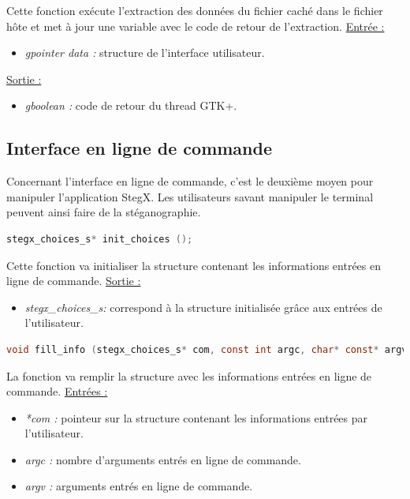 \documentclass[11pt]{article}
\begin{document}
Cette fonction exécute l'extraction des données du fichier caché dans le 
fichier hôte et met à jour une variable avec le code de retour de l'extraction.
\newline
\underline{Entrée :} 
\begin{itemize}
\item \textit{gpointer data :} structure de l'interface utilisateur. 
\end{itemize}
\underline{Sortie :}
\begin{itemize}
\item \textit{gboolean :} code de retour du thread GTK+.
\newline 
\end{itemize}

\subsection{Interface en ligne de commande}

Concernant l'interface en ligne de commande, c'est le deuxième moyen pour 
manipuler l'application StegX. Les utilisateurs savant manipuler le terminal 
peuvent ainsi faire de la stéganographie. 

\begin{lstlisting}[language=c]
stegx_choices_s* init_choices ();
\end{lstlisting}

Cette fonction va initialiser la structure contenant les informations 
entrées en ligne de commande. 
\newline
\underline{Sortie :} 
\begin{itemize}
\item \textit{stegx\_choices\_s:} correspond à la structure initialisée 
grâce aux entrées de l'utilisateur. 
\newline 
\end{itemize}

\begin{lstlisting}[language=c]
void fill_info (stegx_choices_s* com, const int argc, char* const* argv);
\end{lstlisting}

La fonction va remplir la structure avec les informations entrées en 
ligne de commande. 
\newline
\underline{Entrées :} 
\begin{itemize}
\item \textit{*com :} pointeur sur la structure contenant les informations 
entrées par l'utilisateur. 
\item \textit{argc :} nombre d'arguments entrés en ligne de commande. 
\item \textit{argv :} arguments entrés en ligne de commande. 
\newline 
\end{itemize}
\end{document}
